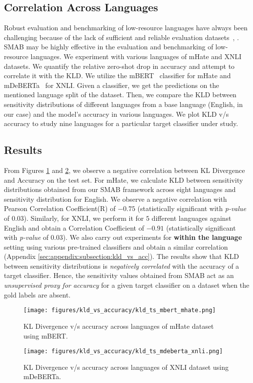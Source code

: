 \subsection{Correlation Across Languages}
Robust evaluation and benchmarking of low-resource languages have always been challenging because of the lack of sufficient and reliable evaluation datasets~\cite{ahuja2022beyond}, \cite{ahuja2022multi}. SMAB may be highly effective in the evaluation and benchmarking of low-resource languages. We experiment with various languages of mHate and XNLI datasets. We quantify the relative zero-shot drop in accuracy and attempt to correlate it with the KLD. We utilize the mBERT~\cite{devlin2019bert} classifier for mHate and mDeBERTa~\cite{he2021debertadecodingenhancedbertdisentangled} for XNLI. Given a classifier, we get the predictions on the mentioned language split of the dataset. Then, we compare the KLD between sensitivity distributions of different languages from a base language (English, in our case) and the model's accuracy in various languages. We plot KLD v/s accuracy to study nine languages for a particular target classifier under study. 

\subsection{Results}
From Figures \ref{fig:mbert_acorss_languges} and \ref{fig:mdeberta_acorss_languges}, we observe a negative correlation between KL Divergence and Accuracy on the test set. For mHate, we calculate KLD between sensitivity distributions obtained from our SMAB framework across eight languages and sensitivity distribution for English. We observe a negative correlation with Pearson Correlation Coefficient(R) of $-0.75$ (statistically significant with \textit{p-value} of $0.03$). Similarly, for XNLI, we perform it for $5$ different languages against English and obtain a Correlation Coefficient of $-0.91$ (statistically significant with \textit{p-value} of $0.03$). We also carry out experiments for \textbf{within the language} setting using various pre-trained classifiers and obtain a similar correlation (Appendix \ref{sec:appendix:subsection:kld_vs_acc}). The results show that KLD between sensitivity distributions is \textit{negatively correlated} with the accuracy of a target classifier. Hence, the sensitivity values obtained from SMAB act as an \textit{unsupervised proxy for accuracy} for a given target classifier on a dataset when the gold labels are absent.

\begin{figure}[t]
    \texttt{[image: figures/kld\_vs\_accuracy/kld\_ts\_mbert\_mhate.png]}
        \caption{KL Divergence v/s accuracy across languages of mHate dataset using mBERT.}
        \label{fig:mbert_acorss_languges}
\end{figure}

\begin{figure}[t]
    \texttt{[image: figures/kld\_vs\_accuracy/kld\_ts\_mdeberta\_xnli.png]}
    \caption{KL Divergence v/s accuracy across languages of XNLI dataset using mDeBERTa.}
    \label{fig:mdeberta_acorss_languges}
\end{figure}

